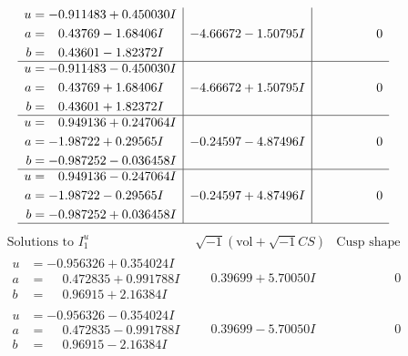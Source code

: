 \documentclass[1p]{elsarticle_modified}
\theoremstyle{definition}
\newcommand{\I}{\sqrt{-1}}
\begin{document}
$$\begin{array}{c|c|c}
\begin{aligned}
u &= -0.911483 + 0.450030 I \\
a &= \phantom{-}0.43769 - 1.68406 I \\
b &= \phantom{-}0.43601 - 1.82372 I\end{aligned}
 & -4.66672 - 1.50795 I & \phantom{-0.000000 } 0 \\ \hline\begin{aligned}
u &= -0.911483 - 0.450030 I \\
a &= \phantom{-}0.43769 + 1.68406 I \\
b &= \phantom{-}0.43601 + 1.82372 I\end{aligned}
 & -4.66672 + 1.50795 I & \phantom{-0.000000 } 0 \\ \hline\begin{aligned}
u &= \phantom{-}0.949136 + 0.247064 I \\
a &= -1.98722 + 0.29565 I \\
b &= -0.987252 - 0.036458 I\end{aligned}
 & -0.24597 - 4.87496 I & \phantom{-0.000000 } 0 \\ \hline\begin{aligned}
u &= \phantom{-}0.949136 - 0.247064 I \\
a &= -1.98722 - 0.29565 I \\
b &= -0.987252 + 0.036458 I\end{aligned}
 & -0.24597 + 4.87496 I & \phantom{-0.000000 } 0\\
 \hline 
 \end{array}$$\newpage$$\begin{array}{c|c|c}  
\text{Solutions to }I^u_{1}& \I (\text{vol} + \sqrt{-1}CS) & \text{Cusp shape}\\
 \hline 
\begin{aligned}
u &= -0.956326 + 0.354024 I \\
a &= \phantom{-}0.472835 + 0.991788 I \\
b &= \phantom{-}0.96915 + 2.16384 I\end{aligned}
 & \phantom{-}0.39699 + 5.70050 I & \phantom{-0.000000 } 0 \\ \hline\begin{aligned}
u &= -0.956326 - 0.354024 I \\
a &= \phantom{-}0.472835 - 0.991788 I \\
b &= \phantom{-}0.96915 - 2.16384 I\end{aligned}
 & \phantom{-}0.39699 - 5.70050 I & \phantom{-0.000000 } 0 \\ \hline\begin{aligned}

\end{aligned}
\end{array}$$
\end{document}
